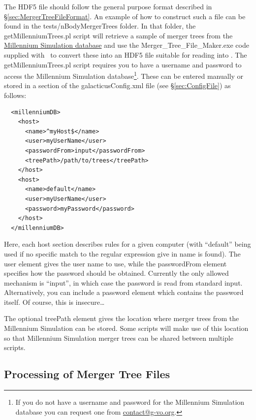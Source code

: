 The HDF5 file should follow the general purpose format described in \S\ref{sec:MergerTreeFileFormat}. An example of how to construct such a file can be found in the {\normalfont \ttfamily tests/nBodyMergerTrees} folder. In that folder, the {\normalfont \ttfamily getMillenniumTrees.pl} script will retrieve a sample of merger trees from the \href{http://www.g-vo.org/MyMillennium3/}{Millennium Simulation database} and use the {\normalfont \ttfamily Merger\_Tree\_File\_Maker.exe} code supplied with \glc\ to convert these into an HDF5 file suitable for reading into \glc. The {\normalfont \ttfamily getMillenniumTrees.pl} script requires you to have a username and password to access the Millennium Simulation database\footnote{If you do not have a username and password for the Millennium Simulation database you can request one from \href{mailto:contact@g-vo.org}{\normalfont \ttfamily contact@g-vo.org}.}. These can be entered manually or stored in a section of the {\normalfont \ttfamily galacticusConfig.xml} file (see \S\ref{sec:ConfigFile}) as follows:
\begin{verbatim}
  <millenniumDB>
    <host>
      <name>^myHost$</name>
      <user>myUserName</user>
      <passwordFrom>input</passwordFrom>
      <treePath>/path/to/trees</treePath>
    </host>
    <host>
      <name>default</name>
      <user>myUserName</user>
      <password>myPassword</password>
    </host>
  </millenniumDB>
\end{verbatim}
Here, each {\normalfont \ttfamily host} section describes rules for a given computer (with ``default'' being used if no specific match to the regular expression give in {\normalfont \ttfamily name} is found). The {\normalfont \ttfamily user} element gives the user name to use, while the {\normalfont \ttfamily passwordFrom} element specifies how the password should be obtained. Currently the only allowed mechanism is ``input'', in which case the password is read from standard input. Alternatively, you can include a {\normalfont \ttfamily password} element which contains the password itself. Of course, this is insecure\ldots

The optional {\normalfont \ttfamily treePath} element gives the location where merger trees from the Millennium Simulation can be stored. Some scripts will make use of this location so that Millennium Simulation merger trees can be shared between multiple scripts.

\subsection{Processing of Merger Tree Files}\label{sec:MergerTreeFileProcessing}

